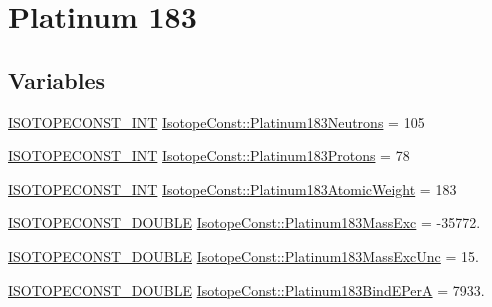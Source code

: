 \hypertarget{group___isotope_const-_platinum-_pt183}{}\section{Platinum 183}
\label{group___isotope_const-_platinum-_pt183}
\subsection*{Variables}
\begin{DoxyCompactItemize}
\item 
\mbox{\hyperlink{group___isotope_const-_macros_ga5f18360b3e99483a35c32d789e62621c}{I\+S\+O\+T\+O\+P\+E\+C\+O\+N\+S\+T\+\_\+\+I\+NT}} \mbox{\hyperlink{group___isotope_const-_platinum-_pt183_ga1d99c45b9b8c89c2d433d1ae602dc820}{Isotope\+Const\+::\+Platinum183\+Neutrons}} = 105
\item 
\mbox{\hyperlink{group___isotope_const-_macros_ga5f18360b3e99483a35c32d789e62621c}{I\+S\+O\+T\+O\+P\+E\+C\+O\+N\+S\+T\+\_\+\+I\+NT}} \mbox{\hyperlink{group___isotope_const-_platinum-_pt183_ga078b017ec976ab659c9164f8a4615d68}{Isotope\+Const\+::\+Platinum183\+Protons}} = 78
\item 
\mbox{\hyperlink{group___isotope_const-_macros_ga5f18360b3e99483a35c32d789e62621c}{I\+S\+O\+T\+O\+P\+E\+C\+O\+N\+S\+T\+\_\+\+I\+NT}} \mbox{\hyperlink{group___isotope_const-_platinum-_pt183_gac12c7d0bb8e31dc3f8402b316737b49b}{Isotope\+Const\+::\+Platinum183\+Atomic\+Weight}} = 183
\item 
\mbox{\hyperlink{group___isotope_const-_macros_ga8f45a7272ce02c0b4c65c44636ed719a}{I\+S\+O\+T\+O\+P\+E\+C\+O\+N\+S\+T\+\_\+\+D\+O\+U\+B\+LE}} \mbox{\hyperlink{group___isotope_const-_platinum-_pt183_ga36fa5d45ec2da3241c4a5802150f57a1}{Isotope\+Const\+::\+Platinum183\+Mass\+Exc}} = -\/35772.
\item 
\mbox{\hyperlink{group___isotope_const-_macros_ga8f45a7272ce02c0b4c65c44636ed719a}{I\+S\+O\+T\+O\+P\+E\+C\+O\+N\+S\+T\+\_\+\+D\+O\+U\+B\+LE}} \mbox{\hyperlink{group___isotope_const-_platinum-_pt183_ga8449228fc1b1aa36a0a1a39cbf65c5b9}{Isotope\+Const\+::\+Platinum183\+Mass\+Exc\+Unc}} = 15.
\item 
\mbox{\hyperlink{group___isotope_const-_macros_ga8f45a7272ce02c0b4c65c44636ed719a}{I\+S\+O\+T\+O\+P\+E\+C\+O\+N\+S\+T\+\_\+\+D\+O\+U\+B\+LE}} \mbox{\hyperlink{group___isotope_const-_platinum-_pt183_ga3041b482f67ab9c53cd0342473614dca}{Isotope\+Const\+::\+Platinum183\+Bind\+E\+PerA}} = 7933.
\item 

\end{DoxyCompactItemize}
